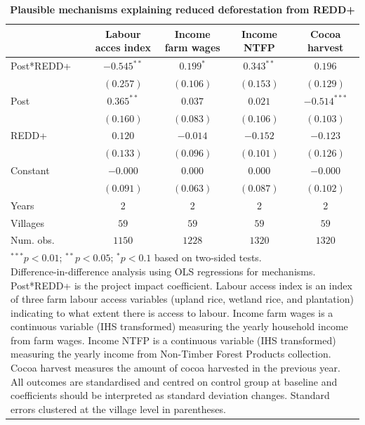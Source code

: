 \documentclass[
]{article}
\begin{document}
\begin{table}[h]
\caption{\textbf{Plausible mechanisms explaining reduced deforestation from REDD+}}
\begin{center}
\begin{tabular}{l c c c c}
\hline
 & Labour acces index & Income farm wages & Income NTFP & Cocoa harvest \\
\hline
Post*REDD+ & $-0.545^{**}$ & $0.199^{*}$ & $0.343^{**}$ & $0.196$        \\
           & $(0.257)$     & $(0.106)$   & $(0.153)$    & $(0.129)$      \\
Post       & $0.365^{**}$  & $0.037$     & $0.021$      & $-0.514^{***}$ \\
           & $(0.160)$     & $(0.083)$   & $(0.106)$    & $(0.103)$      \\
REDD+      & $0.120$       & $-0.014$    & $-0.152$     & $-0.123$       \\
           & $(0.133)$     & $(0.096)$   & $(0.101)$    & $(0.126)$      \\
Constant   & $-0.000$      & $0.000$     & $0.000$      & $-0.000$       \\
           & $(0.091)$     & $(0.063)$   & $(0.087)$    & $(0.102)$      \\
\hline
Years      & 2             & 2           & 2            & 2              \\
Villages   & $59$          & $59$        & $59$         & $59$           \\
Num. obs.  & $1150$        & $1228$      & $1320$       & $1320$         \\
\hline
\multicolumn{5}{l}{\scriptsize{\parbox{.9\linewidth}{\vspace{2pt}$^{***}p<0.01$; $^{**}p<0.05$; $^{*}p<0.1$ based on two-sided tests.\\
       Difference-in-difference analysis using OLS regressions for mechanisms. Post*REDD+ is the project impact coefficient. Labour access index is an index of  three farm labour access variables (upland rice, wetland rice, and plantation) indicating to what extent there is access to labour. Income farm wages is a continuous variable (IHS transformed) measuring the yearly household income from farm wages. Income NTFP is a continuous variable (IHS transformed) measuring the yearly income from Non-Timber Forest Products collection. Cocoa harvest measures the amount of cocoa harvested in the previous year. All outcomes are standardised and centred on control group at baseline and coefficients should be interpreted as standard deviation changes. Standard errors clustered at the village level in parentheses.}}}
\end{tabular}
\label{table:coefficients}
\end{center}
\end{table}
\end{document}
